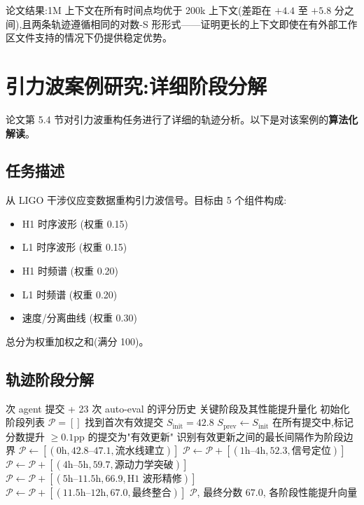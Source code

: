 \documentclass[a4paper,11pt]{article}
\begin{document}
论文结果:1M 上下文在所有时间点均优于 200k 上下文(差距在 $+4.4$ 至 $+5.8$ 分之间),且两条轨迹遵循相同的对数-S 形形式——证明更长的上下文即使在有外部工作区文件支持的情况下仍提供稳定优势。

\section{引力波案例研究:详细阶段分解}

论文第 5.4 节对引力波重构任务进行了详细的轨迹分析。以下是对该案例的\textbf{算法化解读}。

\subsection{任务描述}

从 LIGO 干涉仪应变数据重构引力波信号。目标由 5 个组件构成:
\begin{itemize}
    \item H1 时序波形 (权重 0.15)
    \item L1 时序波形 (权重 0.15)
    \item H1 时频谱 (权重 0.20)
    \item L1 时频谱 (权重 0.20)
    \item 速度/分离曲线 (权重 0.30)
\end{itemize}

总分为权重加权之和(满分 100)。

\subsection{轨迹阶段分解}

\begin{algorithm}[H]
\caption{引力波案例轨迹阶段分析}
\label{alg:gw-analysis}
\begin{algorithmic}[1]
 次 agent 提交 + 23 次 auto-eval 的评分历史
\ENSURE 关键阶段及其性能提升量化
\STATE 初始化阶段列表 $\mathcal{P} = []$
\STATE 找到首次有效提交 $S_{\mathrm{init}} = 42.8$
\STATE $S_{\mathrm{prev}} \gets S_{\mathrm{init}}$
\STATE 在所有提交中,标记分数提升 $\geq 0.1$pp 的提交为"有效更新"
\STATE 识别有效更新之间的最长间隔作为阶段边界
\STATE $\mathcal{P} \gets [(0\text{h}, 42.8\text{--}47.1, \text{流水线建立})]$
\STATE $\mathcal{P} \gets \mathcal{P} + [(1\text{h--}4\text{h}, 52.3, \text{信号定位})]$
\STATE $\mathcal{P} \gets \mathcal{P} + [(4\text{h--}5\text{h}, 59.7, \text{源动力学突破})]$
\STATE $\mathcal{P} \gets \mathcal{P} + [(5\text{h--}11.5\text{h}, 66.9, \text{H1 波形精修})]$
\STATE $\mathcal{P} \gets \mathcal{P} + [(11.5\text{h--}12\text{h}, 67.0, \text{最终整合})]$
\RETURN $\mathcal{P}$, 最终分数 $67.0$, 各阶段性能提升向量
\end{algorithmic}
\end{algorithm}
\end{document}
